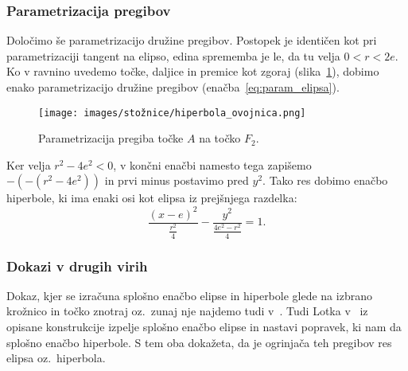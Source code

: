 \subsubsection*{Parametrizacija pregibov}

Določimo še parametrizacijo družine pregibov. Postopek je identičen kot pri parametrizaciji tangent na elipso, edina sprememba je le, da tu velja $0<r<2e$. Ko v ravnino uvedemo točke, daljice in premice kot zgoraj (slika~\ref{fig:enacba_hiperbole}), dobimo enako parametrizacijo družine pregibov (enačba~\ref{eq:param_elipsa}).
\begin{figure}[h]
    \centering
    \texttt{[image: images/stožnice/hiperbola\_ovojnica.png]}
    \caption[Enačba tangente na elipso]{Parametrizacija pregiba točke $A$ na točko $F_2$.}
    \label{fig:enacba_hiperbole}
\end{figure}

Ker velja $r^2-4e^2 < 0$, v končni enačbi namesto tega zapišemo $-(-(r^2-4e^2))$ in prvi minus postavimo pred $y^2$. Tako res dobimo enačbo hiperbole, ki ima enaki osi kot elipsa iz prejšnjega razdelka:
\begin{equation*}
    \frac{(x-e)^2}{\frac{r^2}{4}} - \frac{y^2}{\frac{4e^2-r^2}{4}} = 1.
\end{equation*}

\subsubsection*{Dokazi v drugih virih}

Dokaz, kjer se izračuna splošno enačbo elipse in hiperbole glede na izbrano krožnico in točko znotraj oz.\ zunaj nje najdemo tudi v~\cite[str.\ 204--206]{smith2003}. Tudi Lotka v~\cite{lotka1907} iz opisane konstrukcije izpelje splošno enačbo elipse in nastavi popravek, ki nam da splošno enačbo hiperbole. S tem oba dokažeta, da je ogrinjača teh pregibov res elipsa oz.\ hiperbola.